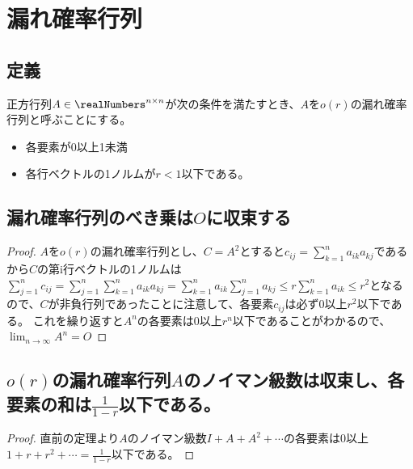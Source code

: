 \chapter{漏れ確率行列}
    \section{定義}
        \begin{shadebox}
            正方行列$A\in\realNumbers^{n\times n}$が次の条件を満たすとき、$A$を$o(r)$の漏れ確率行列と呼ぶことにする。
            \begin{itemize}
                \item 各要素が0以上1未満
                \item 各行ベクトルの1ノルムが$r<1$以下である。
            \end{itemize}
        \end{shadebox}
    \section{漏れ確率行列のべき乗は\texorpdfstring{$O$}{O}に収束する}
        \begin{proof}
            \quad\par
            $A$を$o(r)$の漏れ確率行列とし、$C=A^2$とすると$c_{ij} = \sum_{k=1}^{n}{a_{ik}a_{kj}}$であるから$C$の第i行ベクトルの1ノルムは
            $\sum_{j=1}^{n}{c_{ij}} = \sum_{j=1}^{n}{\sum_{k=1}^{n}{a_{ik}a_{kj}}} = \sum_{k=1}^{n}{a_{ik}\sum_{j=1}^{n}{a_{kj}}} \leq r\sum_{k=1}^{n}{a_{ik}} \leq r^2$となるので、$C$が非負行列であったことに注意して、各要素$c_{ij}$は必ず0以上$r^2$以下である。
            これを繰り返すと$A^n$の各要素は0以上$r^n$以下であることがわかるので、$\lim_{n\rightarrow\infty}{A^n}=O$
        \end{proof}
    \section{\texorpdfstring{$o(r)$}{o(r)}の漏れ確率行列\texorpdfstring{$A$}{A}のノイマン級数は収束し、各要素の和は\texorpdfstring{$\frac{1}{1-r}$}{1/(1-r)}以下である。}
        \begin{proof}
            \quad\par
            直前の定理より$A$のノイマン級数$I+A+A^2+\dotsb$の各要素は0以上$1+r+r^2+\dotsb=\frac{1}{1-r}$以下である。
        \end{proof}
